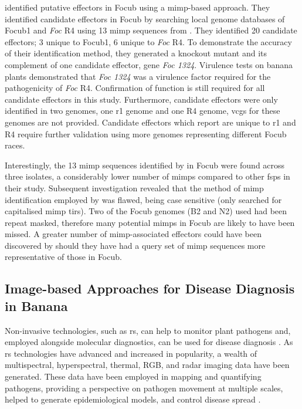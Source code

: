 \textcite{Chang2020} identified putative effectors in \ac{Focub} using a \ac{mimp}-based approach. They identified candidate effectors in \ac{Focub} by searching local genome databases of \ac{Focub1} and \textit{Foc} R4 using 13 \ac{mimp} sequences from \textcite{Dam2016}. They identified 20 candidate effectors; 3 unique to \ac{Focub1}, 6 unique to \textit{Foc} R4. To demonstrate the accuracy of their identification method, they generated a knockout mutant and its complement of one candidate effector, gene \textit{Foc 1324}. Virulence tests on banana plants demonstrated that \textit{Foc 1324} was a virulence factor required for the pathogenicity of \textit{Foc} R4. Confirmation of function is still required for all candidate effectors in this study. Furthermore, candidate effectors were only identified in two genomes, one \ac{r1} genome and one R4 genome, \acp{vcg} for these genomes are not provided. Candidate effectors which \textcite{Chang2020} report are unique to \ac{r1} and R4 require further validation using more genomes representing different \ac{Focub} races.

Interestingly, the 13 mimp sequences identified by \textcite{Dam2016} in \ac{Focub} were found across three isolates, a considerably lower number of \acp{mimp} compared to other \acp{fsp} in their study. Subsequent investigation revealed that the method of \ac{mimp} identification employed by \textcite{Dam2016} was flawed, being case sensitive (only searched for capitalised \ac{mimp} \acp{tir}). Two of the \ac{Focub} genomes (B2 and N2) used had been repeat masked, therefore many potential \acp{mimp} in \ac{Focub} are likely to have been missed. A greater number of \ac{mimp}-associated effectors could have been discovered by \textcite{Chang2020} should they have had a query set of \ac{mimp} sequences more representative of those in \ac{Focub}.

\subsection{Image-based Approaches for Disease Diagnosis in Banana}
 
 Non-invasive technologies, such as \ac{rs}, can help to monitor plant pathogens and, employed alongside molecular diagnostics, can be used for disease diagnosis \parencite{West2010}. As \ac{rs} technologies have advanced and increased in popularity, a wealth of multispectral, hyperspectral, thermal, RGB, and radar imaging data have been generated. These data have been employed in mapping and quantifying pathogens, providing a perspective on pathogen movement at multiple scales, helped to generate epidemiological models, and control disease spread \parencite{Zhang2019}.

